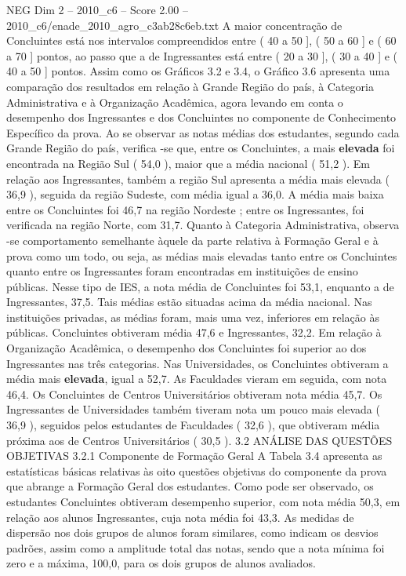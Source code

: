 \begin{textsample}{NEG Dim 2 – 2010\_c6 – Score 2.00 – 2010\_c6/enade\_2010\_agro\_c3ab28c6eb.txt}
A maior concentração de Concluintes está nos intervalos compreendidos entre ( 40 a 50 ], ( 50 a 60 ] e ( 60 a 70 ] pontos, ao passo que a de Ingressantes está entre ( 20 a 30 ], ( 30 a 40 ] e ( 40 a 50 ] pontos.
Assim como os Gráficos 3.2 e 3.4, o Gráfico 3.6 apresenta uma comparação dos resultados em relação à Grande Região do país, à Categoria Administrativa e à Organização Acadêmica, agora levando em conta o desempenho dos Ingressantes e dos Concluintes no componente de Conhecimento Específico da prova.
Ao se observar as notas médias dos estudantes, segundo cada Grande Região do país, verifica -se que, entre os Concluintes, a mais \textbf{elevada} foi encontrada na Região Sul ( 54,0 ), maior que a média nacional ( 51,2 ).
Em relação aos Ingressantes, também a região Sul apresenta a média mais elevada ( 36,9 ), seguida da região Sudeste, com média igual a 36,0.
A média mais baixa entre os Concluintes foi 46,7 na região Nordeste ; entre os Ingressantes, foi verificada na região Norte, com 31,7.
Quanto à Categoria Administrativa, observa -se comportamento semelhante àquele da parte relativa à Formação Geral e à prova como um todo, ou seja, as médias mais elevadas tanto entre os Concluintes quanto entre os Ingressantes foram encontradas em instituições de ensino públicas.
Nesse tipo de IES, a nota média de Concluintes foi 53,1, enquanto a de Ingressantes, 37,5.
Tais médias estão situadas acima da média nacional.
Nas instituições privadas, as médias foram, mais uma vez, inferiores em relação às públicas.
Concluintes obtiveram média 47,6 e Ingressantes, 32,2.
Em relação à Organização Acadêmica, o desempenho dos Concluintes foi superior ao dos Ingressantes nas três categorias.
Nas Universidades, os Concluintes obtiveram a média mais \textbf{elevada}, igual a 52,7.
As Faculdades vieram em seguida, com nota 46,4.
Os Concluintes de Centros Universitários obtiveram nota média 45,7.
Os Ingressantes de Universidades também tiveram nota um pouco mais elevada ( 36,9 ), seguidos pelos estudantes de Faculdades ( 32,6 ), que obtiveram média próxima aos de Centros Universitários ( 30,5 ). 3.2 ANÁLISE DAS QUESTÕES OBJETIVAS 3.2.1 Componente de Formação Geral A Tabela 3.4 apresenta as estatísticas básicas relativas às oito questões objetivas do componente da prova que abrange a Formação Geral dos estudantes.
Como pode ser observado, os estudantes Concluintes obtiveram desempenho superior, com nota média 50,3, em relação aos alunos Ingressantes, cuja nota média foi 43,3.
As medidas de dispersão nos dois grupos de alunos foram similares, como indicam os desvios padrões, assim como a amplitude total das notas, sendo que a nota mínima foi zero e a máxima, 100,0, para os dois grupos de alunos avaliados.

\end{textsample}
